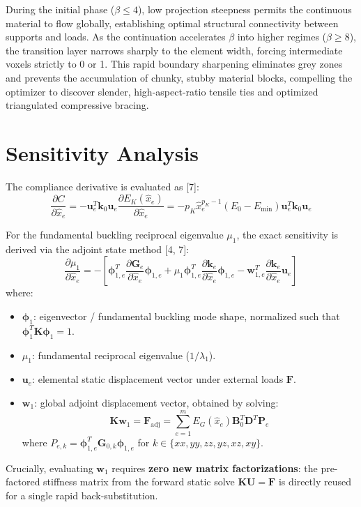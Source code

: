 \documentclass[11pt, a4paper]{article}
\begin{document}
During the initial phase ($\beta \le 4$), low projection steepness permits the continuous material to flow globally, establishing optimal structural connectivity between supports and loads. As the continuation accelerates $\beta$ into higher regimes ($\beta \ge 8$), the transition layer narrows sharply to the element width, forcing intermediate voxels strictly to 0 or 1. This rapid boundary sharpening eliminates grey zones and prevents the accumulation of chunky, stubby material blocks, compelling the optimizer to discover slender, high-aspect-ratio tensile ties and optimized triangulated compressive bracing.

\section{Sensitivity Analysis}
The compliance derivative is evaluated as [7]:
\begin{equation}
\frac{\partial C}{\partial \hat{x}_e} = - \mathbf{u}_e^T \mathbf{k}_0 \mathbf{u}_e \frac{\partial E_K(\hat{x}_e)}{\partial \hat{x}_e} = - p_K \hat{x}_e^{p_K - 1}(E_0 - E_{\min}) \mathbf{u}_e^T \mathbf{k}_0 \mathbf{u}_e
\end{equation}

For the fundamental buckling reciprocal eigenvalue $\mu_1$, the exact sensitivity is derived via the adjoint state method [4, 7]:
\begin{equation}
\frac{\partial \mu_1}{\partial \hat{x}_e} = - \left[ \boldsymbol{\phi}_{1, e}^T \frac{\partial \mathbf{G}_e}{\partial \hat{x}_e} \boldsymbol{\phi}_{1, e} + \mu_1 \boldsymbol{\phi}_{1, e}^T \frac{\partial \mathbf{k}_e}{\partial \hat{x}_e} \boldsymbol{\phi}_{1, e} - \mathbf{w}_{1, e}^T \frac{\partial \mathbf{k}_e}{\partial \hat{x}_e} \mathbf{u}_e \right]
\end{equation}
where:
\begin{itemize}
    \item $\boldsymbol{\phi}_1$: eigenvector / fundamental buckling mode shape, normalized such that $\boldsymbol{\phi}_1^T \mathbf{K} \boldsymbol{\phi}_1 = 1$.
    \item $\mu_1$: fundamental reciprocal eigenvalue ($1/\lambda_1$).
    \item $\mathbf{u}_e$: elemental static displacement vector under external loads $\mathbf{F}$.
    \item $\mathbf{w}_1$: global adjoint displacement vector, obtained by solving:
    \begin{equation}
    \mathbf{K} \mathbf{w}_1 = \mathbf{F}_{\text{adj}} = \sum_{e=1}^m E_G(\hat{x}_e) \mathbf{B}_0^T \mathbf{D}^T \mathbf{P}_e
    \end{equation}
    where $P_{e, k} = \boldsymbol{\phi}_{1, e}^T \mathbf{G}_{0, k} \boldsymbol{\phi}_{1, e}$ for $k \in \{xx, yy, zz, yz, xz, xy\}$.
\end{itemize}
Crucially, evaluating $\mathbf{w}_1$ requires \textbf{zero new matrix factorizations}: the pre-factored stiffness matrix from the forward static solve $\mathbf{K} \mathbf{U} = \mathbf{F}$ is directly reused for a single rapid back-substitution.
\end{document}
